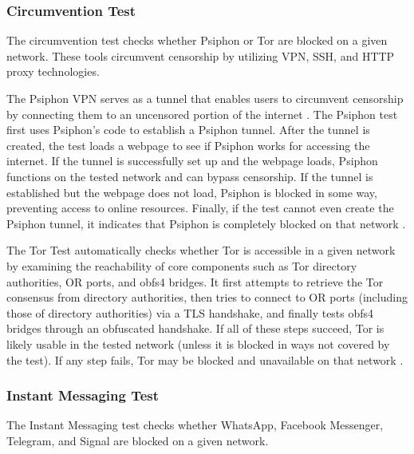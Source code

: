 \subsubsection{Circumvention Test}

The circumvention test checks whether Psiphon or Tor are blocked on a given network. These tools circumvent censorship by utilizing VPN, SSH, and HTTP proxy technologies. 

The Psiphon VPN serves as a tunnel that enables users to circumvent censorship by connecting them to an uncensored portion of the internet \cite{ooniPsiphonTest}. The Psiphon test first uses Psiphon’s code to establish a Psiphon tunnel. After the tunnel is created, the test loads a webpage to see if Psiphon works for accessing the internet. If the tunnel is successfully set up and the webpage loads, Psiphon functions on the tested network and can bypass censorship. If the tunnel is established but the webpage does not load, Psiphon is blocked in some way, preventing access to online resources. Finally, if the test cannot even create the Psiphon tunnel, it indicates that Psiphon is completely blocked on that network \cite{PsiphonTestGitHub}.

The Tor Test \cite{TorTestABOUTOONI} automatically checks whether Tor is accessible in a given network by examining the reachability of core components such as Tor directory authorities, OR ports, and obfs4 bridges. It first attempts to retrieve the Tor consensus from directory authorities, then tries to connect to OR ports (including those of directory authorities) via a TLS handshake, and finally tests obfs4 bridges through an obfuscated handshake. If all of these steps succeed, Tor is likely usable in the tested network (unless it is blocked in ways not covered by the test). If any step fails, Tor may be blocked and unavailable on that network \cite{TorTestGitHub}.


\subsubsection{Instant Messaging Test}

The Instant Messaging test checks whether WhatsApp, Facebook Messenger, Telegram, and Signal are blocked on a given network.

